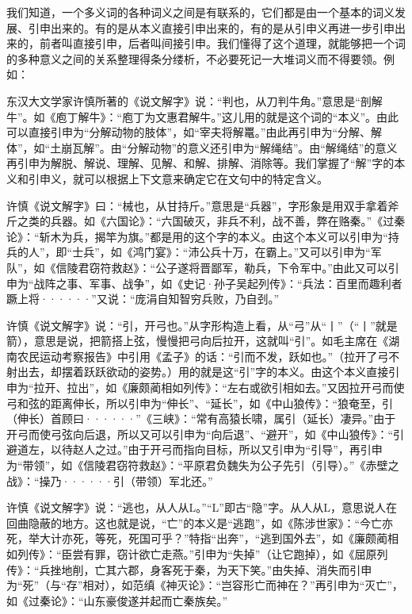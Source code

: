 我们知道，一个多义词的各种词义之间是有联系的，它们都是由一个基本的词义发展、引申出来的。有的是从本义直接引申出来的，有的是从引申义再进一步引申出来的，前者叫直接引申，后者叫间接引申。我们懂得了这个道理，就能够把一个词的多种意义之间的关系整理得条分缕析，不必要死记一大堆词义而不得要领。例如：
\begin{entry}
	
\item[解]东汉大文学家许慎所著的《说文解字》说：“判也，从刀判牛角。”意思是“剖解牛”。如《庖丁解牛》：“庖丁为文惠君解牛。”这儿用的就是这个词的“本义”。由此可以直接引申为“分解动物的肢体”，如“宰夫将解鼍。”由此再引申为“分解、解体”，如“土崩瓦解”。由“分解动物”的意义还引申为“解绳结”。由“解绳结”的意义再引申为解脱、解说、理解、见解、和解、排解、消除等。我们掌握了“解”字的本义和引申义，就可以根据上下文意来确定它在文句中的特定含义。

\item[兵]许慎《说文解字》曰：“械也，从甘持斤。”意思是“兵器”，字形象是用双手拿着斧斤之类的兵器。如《六国论》：“六国破灭，非兵不利，战不善，弊在赂秦。”《过秦论》：“斩木为兵，揭竿为旗。”都是用的这个字的本义。由这个本义可以引申为“持兵的人”，即“士兵”，如《鸿门宴》：“沛公兵十万，在霸上。”又可以引申为“军队”，如《信陵君窃符救赵》：“公子遂将晋鄙军，勒兵，下令军中。”由此又可以引申为“战阵之事、军事、战争”，如《史记·孙子吴起列传》：“兵法：百里而趣利者蹶上将······”又说：“庞涓自知智穷兵败，乃自刭。”

\item[引]许慎《说文解字》说：“引，开弓也。”从字形构造上看，从“弓”从“丨”（“丨”就是箭），意思是说，把箭搭上弦，慢慢把弓向后拉开，这就叫“引”。如毛主席在《湖南农民运动考察报告》中引用《孟子》的话：“引而不发，跃如也。”（拉开了弓不射出去，却摆着跃跃欲动的姿势。）用的就是这“引”字的本义。由这个本义直接引申为“拉开、拉出”，如《廉颇蔺相如列传》：“左右或欲引相如去。”又因拉开弓而使弓和弦的距离伸长，所以引申为“伸长”、“延长”，如《中山狼传》：“狼奄至，引（伸长）首顾曰······”《三峡》：“常有高猿长啸，属引（延长）凄异。”由于开弓而使弓弦向后退，所以又可以引申为“向后退”、“避开”，如《中山狼传》：“引避道左，以待赵人之过。”由于开弓而指向目标，所以又引申为“引导”，再引申为“带领”，如《信陵君窃符救赵》：“平原君负魏失为公子先引（引导）。”《赤壁之战》：“操乃······引（带领）军北还。”

\item[亡]许慎《说文解字》说：“逃也，从人从L。”“L”即古“隐”字。从人从L，意思说人在回曲隐蔽的地方。这也就是说，“亡”的本义是“逃跑”，如《陈涉世家》：“今亡亦死，举大计亦死，等死，死国可乎？”特指“出奔”，“逃到国外去”，如《廉颇蔺相如列传》：“臣尝有罪，窃计欲亡走燕。”引申为“失掉”（让它跑掉），如《屈原列传》：“兵挫地削，亡其六郡，身客死于秦，为天下笑。”由失掉、消失而引申为“死”（与“存”相对），如范缜《神灭论》：“岂容形亡而神在？”再引申为“灭亡”，如《过秦论》：“山东豪俊遂并起而亡秦族矣。”


\end{entry}
